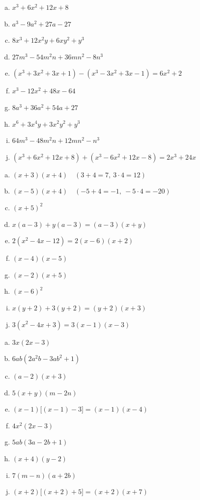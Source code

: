 \documentclass[a4paper,12pt]{letter}
\begin{document}
\begin{resitev}
\begin{enumerate}[a)]
\item $\displaystyle x^3+6x^2+12x+8$
\item $\displaystyle a^3-9a^2+27a-27$
\item $\displaystyle 8x^3+12x^2y+6xy^2+y^3$
\item $\displaystyle 27m^3-54m^2n+36mn^2-8n^3$
\item $\displaystyle (x^3+3x^2+3x+1)-(x^3-3x^2+3x-1)=6x^2+2$
\item $\displaystyle x^3-12x^2+48x-64$
\item $\displaystyle 8a^3+36a^2+54a+27$
\item $\displaystyle x^6+3x^4y+3x^2y^2+y^3$
\item $\displaystyle 64m^3-48m^2n+12mn^2-n^3$
\item $\displaystyle (x^3+6x^2+12x+8)+(x^3-6x^2+12x-8)=2x^3+24x$
\end{enumerate}
\end{resitev}

\begin{resitev}[-- Razstavljanje]
\begin{enumerate}[a)]
\item $\displaystyle (x+3)(x+4)\quad(3+4=7,\ 3\cdot4=12)$
\item $\displaystyle (x-5)(x+4)\quad(-5+4=-1,\ -5\cdot4=-20)$
\item $\displaystyle (x+5)^2$
\item $\displaystyle x(a-3)+y(a-3)=(a-3)(x+y)$
\item $\displaystyle 2(x^2-4x-12)=2(x-6)(x+2)$
\item $\displaystyle (x-4)(x-5)$
\item $\displaystyle (x-2)(x+5)$
\item $\displaystyle (x-6)^2$
\item $\displaystyle x(y+2)+3(y+2)=(y+2)(x+3)$
\item $\displaystyle 3(x^2-4x+3)=3(x-1)(x-3)$
\end{enumerate}
\end{resitev}

\begin{resitev}
\begin{enumerate}[a)]
\item $\displaystyle 3x(2x-3)$
\item $\displaystyle 6ab(2a^2b-3ab^2+1)$
\item $\displaystyle (a-2)(x+3)$
\item $\displaystyle 5(x+y)(m-2n)$
\item $\displaystyle (x-1)\big[(x-1)-3\big]=(x-1)(x-4)$
\item $\displaystyle 4x^2(2x-3)$
\item $\displaystyle 5ab(3a-2b+1)$
\item $\displaystyle (x+4)(y-2)$
\item $\displaystyle 7(m-n)(a+2b)$
\item $\displaystyle (x+2)\big[(x+2)+5\big]=(x+2)(x+7)$
\end{enumerate}
\end{resitev}
\end{document}
